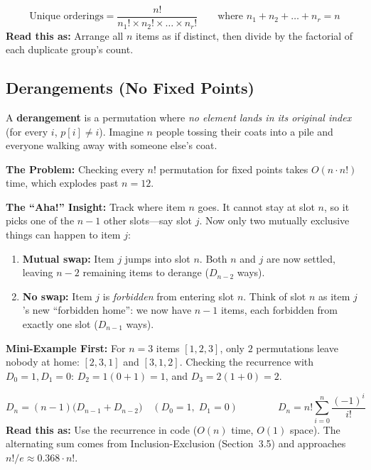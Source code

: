 \documentclass[11pt,a4paper]{article}
\theoremstyle{definition}
\newcommand{\painbeat}{\textbf{\color{accentamber}The Problem:} }
\newcommand{\ahabeat}{\textbf{\color{accentteal}The ``Aha!'' Insight:} }
\newcommand{\examplebeat}{\textbf{\color{primaryblue}Mini-Example First:} }
\begin{document}
\begin{formulabox}
\[
    \text{Unique orderings} = \frac{n!}{n_1! \times n_2! \times \dots \times n_r!}
    \qquad \text{where } n_1 + n_2 + \dots + n_r = n
\]
\textbf{Read this as:} Arrange all $n$ items as if distinct, then divide by the factorial of each duplicate group's count.
\end{formulabox}

\subsection{Derangements (No Fixed Points)}

A \textbf{derangement} is a permutation where \emph{no element lands in its original index} (for every $i$, $p[i] \neq i$). Imagine $n$ people tossing their coats into a pile and everyone walking away with someone else's coat.

\painbeat Checking every $n!$ permutation for fixed points takes $O(n \cdot n!)$ time, which explodes past $n = 12$.

\ahabeat Track where item $n$ goes. It cannot stay at slot $n$, so it picks one of the $n - 1$ other slots---say slot $j$. Now only two mutually exclusive things can happen to item $j$:
\begin{enumerate}
    \item \textbf{Mutual swap:} Item $j$ jumps into slot $n$. Both $n$ and $j$ are now settled, leaving $n - 2$ remaining items to derange ($D_{n-2}$ ways).
    \item \textbf{No swap:} Item $j$ is \emph{forbidden} from entering slot $n$. Think of slot $n$ as item $j$'s new ``forbidden home'': we now have $n - 1$ items, each forbidden from exactly one slot ($D_{n-1}$ ways).
\end{enumerate}

\examplebeat For $n = 3$ items $[1, 2, 3]$, only $2$ permutations leave nobody at home: $[2, 3, 1]$ and $[3, 1, 2]$. Checking the recurrence with $D_0 = 1, D_1 = 0$: $D_2 = 1(0 + 1) = 1$, and $D_3 = 2(1 + 0) = 2$.

\begin{formulabox}
\[
    D_n = (n - 1)\bigl(D_{n-1} + D_{n-2}\bigr) \quad (D_0 = 1,\; D_1 = 0)
    \qquad\qquad
    D_n = n! \sum_{i=0}^{n} \frac{(-1)^i}{i!}
\]
\textbf{Read this as:} Use the recurrence in code ($O(n)$ time, $O(1)$ space). The alternating sum comes from Inclusion-Exclusion (Section~3.5) and approaches $n! / e \approx 0.368 \cdot n!$.
\end{formulabox}
\end{document}
